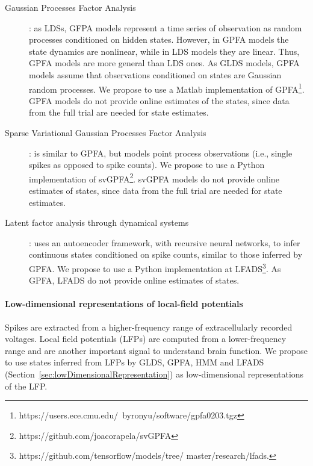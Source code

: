 \begin{description}
    \item[Gaussian Processes Factor Analysis]\citep[GPFA;][]{yuEtAl09}: as
        LDSs, GFPA models represent a time series of observation as random
        processes conditioned on hidden states. However, in GPFA models the
        state dynamics are nonlinear, while in LDS models they are linear.
        Thus, GPFA models are more general than LDS ones. As GLDS models, GPFA
        models assume that observations conditioned on states are Gaussian
        random processes. We propose to use a Matlab implementation of
        GPFA\footnote{https://users.ece.cmu.edu/~byronyu/software/gpfa0203.tgz}.
        GPFA models do not provide online estimates of the states, since data
        from the full trial are needed for state estimates.

    \item[Sparse Variational Gaussian Processes Factor
        Analysis]\citep[svGPFA;][]{dunckerAndSahani18}: is similar to GPFA, but
        models point process observations (i.e., single spikes as opposed to
        spike counts). We propose to use a Python implementation of
        svGPFA\footnote{https://github.com/joacorapela/svGPFA}.
        svGPFA models do not provide online estimates of states, since data
        from the full trial are needed for state estimates.

    \item[Latent factor analysis through dynamical
        systems]\citep[LFADS;][]{pandarinathEtAl18}: uses an autoencoder
        framework, with recursive neural networks, to infer continuous states
        conditioned on spike counts, similar to those inferred by GPFA. We
        propose to use a Python implementation at
        LFADS\footnote{https://github.com/tensorflow/models/tree/ master/research/lfads.}.
        As GPFA, LFADS do not provide online estimates of states.

\end{description}

\paragraph{Low-dimensional representations of local-field potentials}
\label{sec:lowDimensionalRepresentationsOfLFPs}

Spikes are extracted from a higher-frequency range of extracellularly recorded
voltages. Local field potentials (LFPs) are computed from a lower-frequency
range and are another important signal to understand brain function. We propose
to use states inferred from LFPs by GLDS, GPFA, HMM and LFADS
(Section~\ref{sec:lowDimensionalRepresentation}) as
low-dimensional representations of the LFP.


